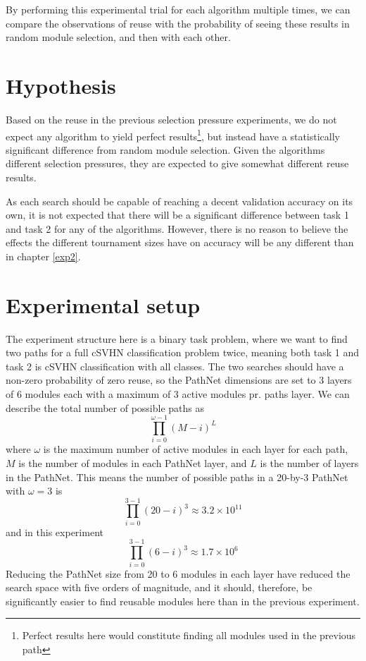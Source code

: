 By performing this experimental trial for each algorithm multiple times, we can compare the observations of reuse with the probability of seeing these results in random module selection, and then with each other. 

\section{Hypothesis}
Based on the reuse in the previous selection pressure experiments, we do not expect any algorithm to yield perfect results\footnote{Perfect results here would constitute finding all modules used in the previous path}, but instead have a statistically significant difference from random module selection. Given the algorithms different selection pressures, they are expected to give somewhat different reuse results.

As each search should be capable of reaching a decent validation accuracy on its own, it is not expected that there will be a significant difference between task 1 and task 2 for any of the algorithms. However, there is no reason to believe the effects the different tournament sizes have on accuracy will be any different than in chapter \ref{exp2}. 

\section{Experimental setup}
\label{exp3:implementation}
The experiment structure here is a binary task problem, where we want to find two paths for a full cSVHN classification problem twice, meaning both task 1 and task 2 is cSVHN classification with all classes. The two searches should have a non-zero probability of zero reuse, so the PathNet dimensions are set to 3 layers of 6 modules each with a maximum of 3 active modules pr. paths layer. We can describe the total number of possible paths as 
\begin{equation*}
    \prod_{i=0}^{\omega-1}(M-i)^{L}
\end{equation*}
where \(\omega\) is the maximum number of active modules in each layer for each path, \(M\) is the number of modules in each PathNet layer, and  \(L\) is the number of layers in the PathNet. This means the number of possible paths in a 20-by-3 PathNet with \(\omega=3\) is  
\begin{equation*}
    \prod_{i=0}^{3-1}(20-i)^{3}\approx 3.2\times10^{11}
\end{equation*}
and in this experiment
\begin{equation*}
    \prod_{i=0}^{3-1}(6-i)^{3}\approx 1.7\times10^{6}
\end{equation*}
Reducing the PathNet size from 20 to 6 modules in each layer have reduced the search space with five orders of magnitude, and it should, therefore, be significantly easier to find reusable modules here than in the previous experiment.

